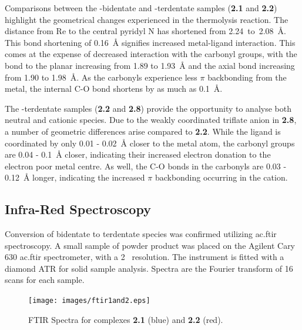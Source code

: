 Comparisons between the -bidentate and -terdentate samples (\textbf{2.1} and \textbf{2.2}) highlight the geometrical changes experienced in the thermolysis reaction. The distance from Re to the central pyridyl N has shortened from 2.24~to~2.08~\r{A}. This bond shortening of 0.16~\r{A} signifies increased metal-ligand interaction. This comes at the expense of decreased interaction with the carbonyl groups, with the bond to the planar  increasing from 1.89 to 1.93~\r{A} and the axial  bond increasing from 1.90 to 1.98~\r{A}. As the carbonyls experience less $\pi$ backbonding from the metal, the internal C-O bond shortens by as much as 0.1~\r{A}. 

The -terdentate samples (\textbf{2.2} and \textbf{2.8}) provide the opportunity to analyse both neutral and cationic species. Due to the weakly coordinated triflate anion in \textbf{2.8}, a number of geometric differences arise compared to \textbf{2.2}. While the ligand is coordinated by only 0.01 - 0.02~\r{A} closer to the metal atom, the carbonyl groups are 0.04 - 0.1~\r{A} closer, indicating their increased electron donation to the electron poor metal centre. As well, the C-O bonds in the carbonyls are 0.03 - 0.12~\r{A} longer, indicating the increased $\pi$ backbonding occurring in the cation.  





\FloatBarrier

\subsection{Infra-Red Spectroscopy}

Conversion of bidentate to terdentate species was confirmed utilizing \gls{ac.ftir} spectroscopy. A small sample of powder product was placed on the Agilent Cary 630 \gls{ac.ftir} spectrometer, with a 2~ resolution. The instrument is fitted with a diamond ATR for solid sample analysis. Spectra are the Fourier transform of 16 scans for each sample.

\begin{figure}[!htb]
 \begin{center}
  \texttt{[image: images/ftir1and2.eps]}
 \end{center}
\caption[FTIR Spectra for complexes \textbf{2.1} and \textbf{2.2}.]{FTIR Spectra for complexes \textbf{2.1} (blue) and \textbf{2.2} (red).}
\label{fig.ir1}
\end{figure} 

